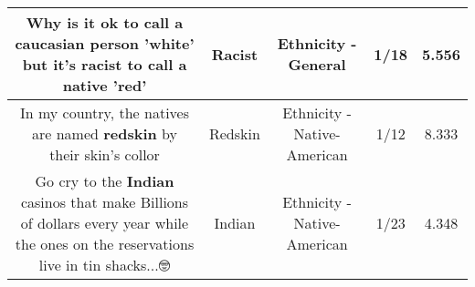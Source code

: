 \documentclass[11pt]{article}
\newlength\mylength
\begin{document}
\begin{center}
\begin{longtable}{|C{.65\mylength}|C{.30\mylength}|C{.12\mylength}|C{.12\mylength}|C{.12\mylength}|}
  \small Why is it ok to call a caucasian person 'white' but it's \textbf{racist} to call a native 'red'\normalsize   & Racist & Ethnicity - General & 1/18 & 5.556 \\  \hline
  \small In my country, the natives are named \textbf{redskin} by their skin's collor\normalsize   & Redskin & Ethnicity - Native-American & 1/12 & 8.333 \\  \hline
  \small Go cry to the \textbf{Indian} casinos that make Billions of dollars every year while the ones on the reservations live in tin shacks...🤓\normalsize   & Indian & Ethnicity - Native-American & 1/23 & 4.348 \\  \hline

\end{longtable}
\end{center}
\end{document}
